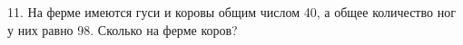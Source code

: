 11. На ферме имеются гуси и коровы общим числом 40, а общее количество ног у них равно 98. Сколько на ферме коров?\\
